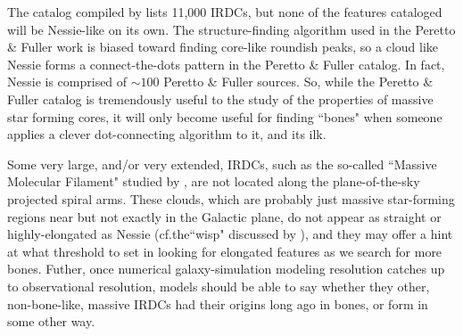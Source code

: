 The catalog compiled by \citet{Peretto2009a} lists 11,000 IRDCs, but none of the features cataloged will be Nessie-like on its own.  The structure-finding algorithm used in the Peretto \& Fuller work is biased toward finding core-like roundish peaks, so a cloud like Nessie forms a connect-the-dots pattern in the Peretto \& Fuller catalog.  In fact, Nessie is comprised of $\sim 100$ Peretto \& Fuller sources. So, while the Peretto \& Fuller catalog is tremendously useful to the study of the properties of massive star forming cores, it will only become useful for finding ``bones" when someone applies a clever dot-connecting algorithm to it, and its ilk.

Some very large, and/or very extended, IRDCs, such as the so-called ``Massive Molecular Filament" studied by \citet{Battersby}, are not located along the plane-of-the-sky projected spiral arms.  These clouds, which are probably just massive star-forming regions near but not exactly in the Galactic plane, do not appear as straight or highly-elongated as Nessie (cf.the``wisp" discussed by \citet {2013A&A...559A..34L}), and they may offer a hint at what threshold to set in looking for elongated features as we search for more bones.  Futher, once numerical galaxy-simulation modeling resolution catches up to observational resolution, models should be able to say whether they other, non-bone-like, massive IRDCs had their origins long ago in bones, or form in some other way.